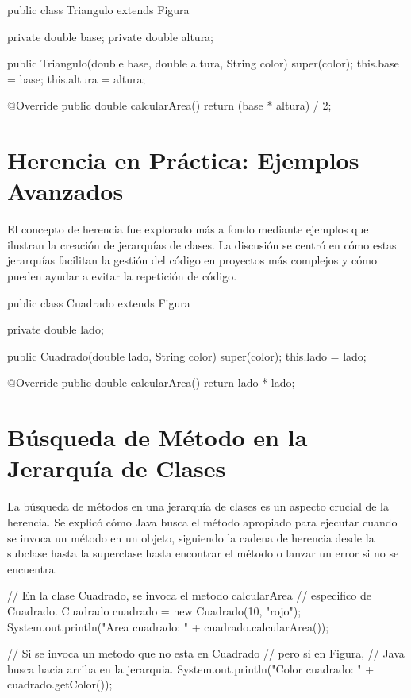 \documentclass[a4paper]{report}
\begin{document}
\begin{roundedlst}
public class Triangulo extends Figura {
    private double base;
    private double altura;

    public Triangulo(double base, double altura, String color) {
        super(color);
        this.base = base;
        this.altura = altura;
    }

    @Override
    public double calcularArea() {
        return (base * altura) / 2;
    }
}
\end{roundedlst}

\section{Herencia en Práctica: Ejemplos Avanzados}
El concepto de herencia fue explorado más a fondo mediante ejemplos que ilustran la creación de jerarquías de clases. La discusión se centró en cómo estas jerarquías facilitan la gestión del código en proyectos más complejos y cómo pueden ayudar a evitar la repetición de código.

\begin{roundedlst}
public class Cuadrado extends Figura {
    private double lado;

    public Cuadrado(double lado, String color) {
        super(color);
        this.lado = lado;
    }

    @Override
    public double calcularArea() {
        return lado * lado;
    }
}
\end{roundedlst}

\section{Búsqueda de Método en la Jerarquía de Clases}
La búsqueda de métodos en una jerarquía de clases es un aspecto crucial de la herencia. Se explicó cómo Java busca el método apropiado para ejecutar cuando se invoca un método en un objeto, siguiendo la cadena de herencia desde la subclase hasta la superclase hasta encontrar el método o lanzar un error si no se encuentra.

\begin{roundedlst}
// En la clase Cuadrado, se invoca el metodo calcularArea 
// especifico de Cuadrado.
Cuadrado cuadrado = new Cuadrado(10, "rojo");
System.out.println("Area cuadrado: " + 
                   cuadrado.calcularArea());

// Si se invoca un metodo que no esta en Cuadrado
// pero si en Figura, 
// Java busca hacia arriba en la jerarquia.
System.out.println("Color cuadrado: " 
                   + cuadrado.getColor());
\end{roundedlst}
\end{document}
